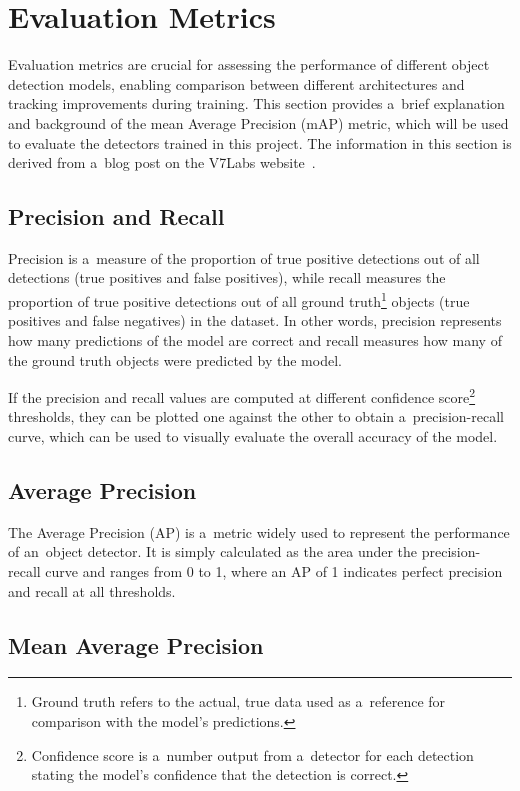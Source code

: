 \section{Evaluation Metrics}
\label{EvaluationMetrics}

Evaluation metrics are crucial for assessing the performance of different object
detection models, enabling comparison between different architectures and
tracking improvements during training. This section provides a~brief
explanation and background of the mean Average Precision (mAP) metric, which
will be used to evaluate the detectors trained in this project. The information
in this section is derived from a~blog post on the V7Labs website~\cite{mAP}.


\subsection*{Precision and Recall}

Precision is a~measure of the proportion of true positive detections out of all
detections (true positives and false positives), while recall measures the
proportion of true positive detections out of all ground truth\footnote{Ground
truth refers to the actual, true data used as a~reference for comparison with
the model's predictions.} objects (true positives and false negatives) in the
dataset. In other words, precision represents how many predictions of the model are
correct and recall measures how many of the ground truth objects were predicted
by the model.

If the precision and recall values are computed at different confidence
score\footnote{Confidence score is a~number output from a~detector for each
detection stating the model's confidence that the detection is correct.}
thresholds, they can be plotted one against the other to obtain
a~precision-recall curve, which can be used to visually evaluate the overall
accuracy of the model.


\subsection*{Average Precision}

The Average Precision (AP) is a~metric widely used to represent the performance
of an~object detector. It is simply calculated as the area under the
precision-recall curve and ranges from 0 to 1, where an AP of 1 indicates
perfect precision and recall at all thresholds.


\subsection*{Mean Average Precision}

